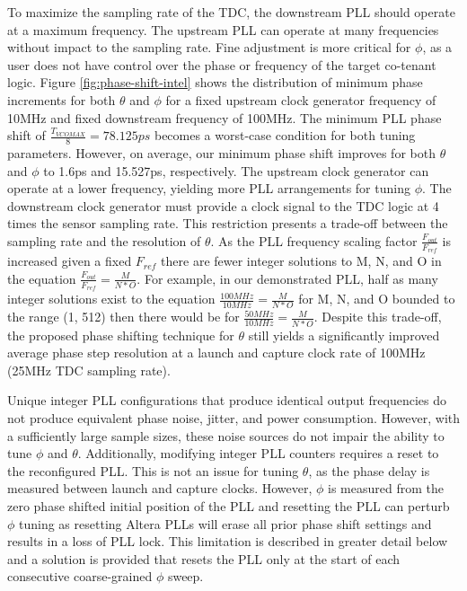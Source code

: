 

To maximize the sampling rate of the TDC, the downstream PLL should
operate at a maximum frequency. The upstream PLL can operate at many
frequencies without impact to the sampling rate. Fine adjustment is more
critical for $\phi$, as a user does not have control over the phase or
frequency of the target co-tenant logic. Figure
\ref{fig:phase-shift-intel} shows the distribution of minimum phase
increments for both $\theta$ and $\phi$ for a fixed upstream clock
generator frequency of 10MHz and fixed downstream frequency of 100MHz.
The minimum PLL phase shift of $\frac{T_{VCOMAX}}{8}=78.125ps$ becomes a
worst-case condition for both tuning parameters. However, on average,
our minimum phase shift improves for both $\theta$ and $\phi$ to 1.6ps
and 15.527ps, respectively. The upstream clock generator can operate at
a lower frequency, yielding more PLL arrangements for tuning $\phi$. The
downstream clock generator must provide a clock signal to the TDC logic
at 4 times the sensor sampling rate. This restriction presents a
trade-off between the sampling rate and the resolution of $\theta$. As
the PLL frequency scaling factor $\frac{F_{out}}{F_{ref}}$ is increased
given a fixed $F_{ref}$ there are fewer integer solutions to M, N, and O
in the equation $\frac{F_{out}}{F_{ref}}=\frac{M}{N*O}$. For example, in
our demonstrated PLL, half as many integer solutions exist to the
equation $\frac{100MHz}{10MHz} =\frac{M}{N*O}$ for M, N, and O bounded
to the range (1, 512) then there would be for $\frac{50MHz}{10MHz}
	=\frac{M}{N*O}$. Despite this trade-off, the proposed phase shifting
technique for $\theta$ still yields a significantly improved average
phase step resolution at a launch and capture clock rate of 100MHz
(25MHz TDC sampling rate).



Unique integer PLL configurations that produce identical output
frequencies do not produce equivalent phase noise, jitter, and power
consumption. However, with a sufficiently large sample sizes, these
noise sources do not impair the ability to tune $\phi$ and $\theta$.
Additionally, modifying integer PLL counters requires a reset to the
reconfigured PLL. This is not an issue for tuning $\theta$, as the phase
delay is measured between launch and capture clocks. However, $\phi$ is
measured from the zero phase shifted initial position of the PLL and
resetting the PLL can perturb $\phi$ tuning as resetting Altera PLLs
will erase all prior phase shift settings and results in a loss of PLL
lock. This limitation is described in greater detail below and a
solution is provided that resets the PLL only at the start of each
consecutive coarse-grained $\phi$ sweep.

